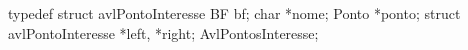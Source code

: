 typedef struct avlPontoInteresse {
	BF bf;
	char *nome;
	Ponto *ponto;
	struct avlPontoInteresse *left, *right;
}AvlPontosInteresse;
